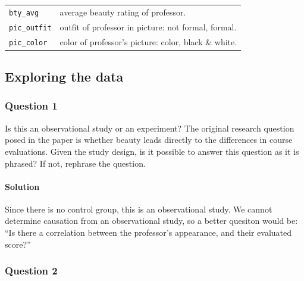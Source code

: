 \documentclass[]{article}
\let\oldparagraph\paragraph
\renewcommand{\paragraph}[1]{\oldparagraph{#1}\mbox{}}
\begin{document}
\begin{longtable}[]{@{}ll@{}}
\begin{minipage}[t]{0.22\columnwidth}
\texttt{bty\_avg}\strut
\end{minipage} & \begin{minipage}[t]{0.16\columnwidth}\raggedright\strut
average beauty rating of professor.\strut
\end{minipage}\tabularnewline
\begin{minipage}[t]{0.22\columnwidth}\raggedright\strut
\texttt{pic\_outfit}\strut
\end{minipage} & \begin{minipage}[t]{0.16\columnwidth}\raggedright\strut
outfit of professor in picture: not formal, formal.\strut
\end{minipage}\tabularnewline
\begin{minipage}[t]{0.22\columnwidth}\raggedright\strut
\texttt{pic\_color}\strut
\end{minipage} & \begin{minipage}[t]{0.16\columnwidth}\raggedright\strut
color of professor's picture: color, black \& white.\strut
\end{minipage}\tabularnewline
\bottomrule
\end{longtable}

\subsection{Exploring the data}\label{exploring-the-data}

\subsubsection{Question 1}\label{question-1}

Is this an observational study or an experiment? The original research
question posed in the paper is whether beauty leads directly to the
differences in course evaluations. Given the study design, is it
possible to answer this question as it is phrased? If not, rephrase the
question.

\paragraph{Solution}\label{solution}

Since there is no control group, this is an observational study. We
cannot determine causation from an observational study, so a better
quesiton would be: ``Is there a correlation between the professor's
appearance, and their evaluated score?''

\subsubsection{Question 2}\label{question-2}
\end{document}
